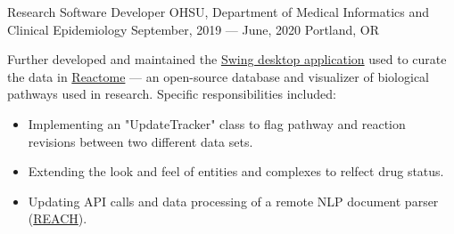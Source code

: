 \showoff
{Research Software Developer}
{OHSU, Department of Medical Informatics and Clinical Epidemiology}
{September, 2019 --- June, 2020}
{Portland, OR}

Further developed and maintained the {\textcolor{my-blue}{\href{https://github.com/reactome/CuratorTool}{Swing desktop application}}} used to curate the data in {\textcolor{my-blue}{\href{https://reactome.org/}{Reactome}}} --- an open-source database and visualizer of biological pathways used in research. Specific responsibilities included:

\begin{itemize}[label=$\triangleright$]
\item Implementing an "UpdateTracker" class to flag pathway and reaction revisions between two different data sets.
\item Extending the look and feel of entities and complexes to relfect drug status.
\item Updating API calls and data processing of a remote NLP document parser (\textcolor{my-blue}{\href{https://github.com/clulab/reach}{REACH}}).
\end{itemize}

